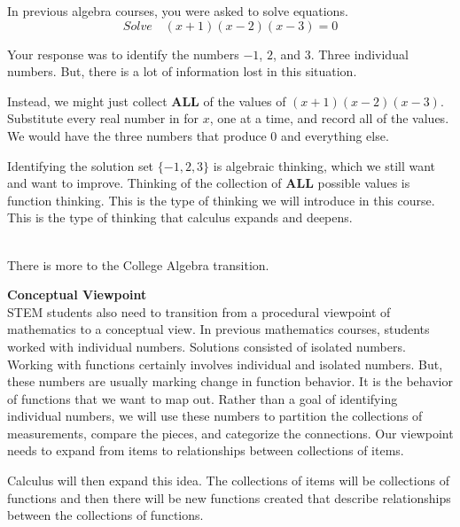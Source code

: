 \documentclass{ximera}
\begin{document}
\begin{idea}
In previous algebra courses, you were asked to solve equations.
\[
Solve \quad (x+1)(x-2)(x-3) = 0
\]

Your response was to identify the numbers $-1$, $2$, and $3$. Three individual numbers. But, there is a lot of information lost in this situation.

Instead, we might just collect \textbf{ALL} of the values of $(x+1)(x-2)(x-3)$.  Substitute every real number in for $x$, one at a time, and record all of the values. We would have the three numbers that produce $0$ and everything else.

Identifying the solution set $\{ -1, 2, 3 \}$ is algebraic thinking, which we still want and want to improve.  Thinking of the collection of \textbf{ALL} possible values is function thinking.  This is the type of thinking we will introduce in this course.  This is the type of thinking that calculus expands and deepens.

\end{idea}  

\quad \\
There is more to the College Algebra transition.








\textbf{Conceptual Viewpoint} \\
STEM students also need to transition from a procedural viewpoint of mathematics to a conceptual view. In previous mathematics courses, students worked with individual numbers. Solutions consisted of isolated numbers. Working with functions certainly involves individual and isolated numbers. But, these numbers are usually marking change in function behavior. It is the behavior of functions that we want to map out. Rather than a goal of identifying individual numbers, we will use these numbers to partition the collections of measurements, compare the pieces, and categorize the connections. Our viewpoint needs to expand from items to relationships between collections of items.

Calculus will then expand this idea.  The collections of items will be collections of functions and then there will be new functions created that describe relationships between the collections of functions.
\end{document}
